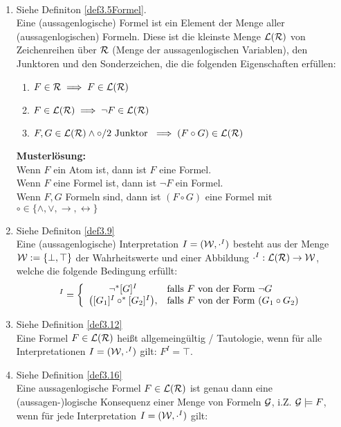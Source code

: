 \begin{lösung}\
	\begin{enumerate}
		\item Siehe Definiton \ref{def3.5Formel}.\\
			Eine (aussagenlogische) Formel ist ein Element der Menge aller (aussagenlogischen) Formeln. 
			Diese ist die kleinste Menge $\mathcal{L}(\mathcal{R})$ von Zeichenreihen über $\mathcal{R}$ (Menge der aussagenlogischen Variablen), den Junktoren und den Sonderzeichen, die die folgenden Eigenschaften erfüllen:
			\begin{enumerate}
				\item $F\in\mathcal{R}\implies F\in\mathcal{L}(\mathcal{R})$
				\item $F\in\mathcal{L}(\mathcal{R})\implies\neg F\in\mathcal{L}(\mathcal{R})$
				\item $F,G\in\mathcal{L}(\mathcal{R})\wedge\circ/2\text{ Junktor }\implies(F\circ G)\in\mathcal{L}(\mathcal{R})$
			\end{enumerate}
			\textbf{Musterlösung:}\\
			Wenn $F$ ein Atom ist, dann ist $F$ eine Formel.\\
			Wenn $F$ eine Formel ist, dann ist $\neg F$ ein Formel.\\
			Wenn $F,G$ Formeln sind, dann ist $(F\circ G)$ eine Formel mit 
			$\circ\in\lbrace\wedge, \vee,\to,\longleftrightarrow\rbrace$
		\item Siehe Definiton \ref{def3.9}\\
			Eine (aussagenlogische) Interpretation $I=(\mathcal{W},\cdot^I)$ besteht aus der Menge $\mathcal{W}:=\lbrace\bot,\top\rbrace$ der Wahrheitswerte und einer Abbildung $\cdot^I:\mathcal{L}(\mathcal{R})\to\mathcal{W}$, welche die folgende Bedingung erfüllt:
			\begin{align*}
				[F]^I=\left\lbrace\begin{array}{cl}
					\neg^\ast[G]^I & \falls F \text{ von der Form }\neg G\\
					\big([G_1]^I\circ^\ast[G_2]^I\big), &\falls F\text{ von der Form }(G_1\circ G_2)
				\end{array}\right.
			\end{align*}
		\item Siehe Definition \ref{def3.12}\\
			Eine Formel $F\in\mathcal{L}(\mathcal{R})$ heißt allgemeingültig / Tautologie, wenn für alle Interpretationen $I=(\mathcal{W},\cdot^I)$ gilt: $F^I=\top$.
		\item Siehe Definition \ref{def3.16}\\
			Eine aussagenlogische Formel $F\in\mathcal{L}(\mathcal{R})$ ist genau dann eine (aussagen-)logische Konsequenz einer Menge von Formeln $\mathcal{G}$, i.Z. $\mathcal{G}\models F$, wenn für jede Interpretation $I=(\mathcal{W},\cdot^I)$ gilt:\\

\end{enumerate}
\end{lösung}
